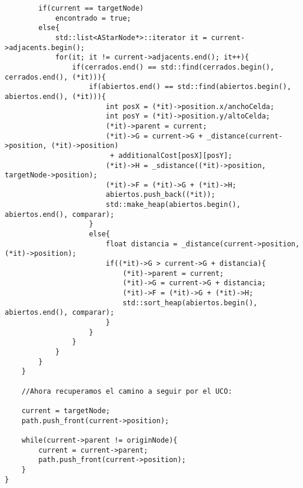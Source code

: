\begin{verbatim}
    	if(current == targetNode)
    		encontrado = true;
    	else{ 
    		std::list<AStarNode*>::iterator it = current->adjacents.begin();
    		for(it; it != current->adjacents.end(); it++){
    			if(cerrados.end() == std::find(cerrados.begin(), cerrados.end(), (*it))){
    				if(abiertos.end() == std::find(abiertos.begin(), abiertos.end(), (*it))){
    					int posX = (*it)->position.x/anchoCelda;
    					int posY = (*it)->position.y/altoCelda;
    					(*it)->parent = current;
    					(*it)->G = current->G + _distance(current->position, (*it)->position)
    					 + additionalCost[posX][posY];
    					(*it)->H = _sdistance((*it)->position, targetNode->position);
    					(*it)->F = (*it)->G + (*it)->H;
    					abiertos.push_back((*it));
    					std::make_heap(abiertos.begin(), abiertos.end(), comparar);
    				}
    				else{  
    					float distancia = _distance(current->position, (*it)->position);
    					if((*it)->G > current->G + distancia){
    						(*it)->parent = current;
    						(*it)->G = current->G + distancia;
    						(*it)->F = (*it)->G + (*it)->H;
    						std::sort_heap(abiertos.begin(), abiertos.end(), comparar);
    					}
    				}
    			}
    		}
    	}
    }

    //Ahora recuperamos el camino a seguir por el UCO:

    current = targetNode;
    path.push_front(current->position);

    while(current->parent != originNode){
        current = current->parent;
        path.push_front(current->position);
    }
}
\end{verbatim}